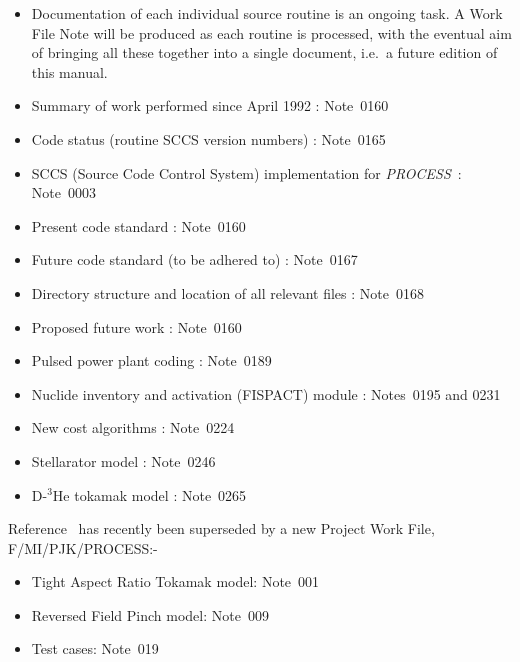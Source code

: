 \documentclass[11pt,a4paper]{report}
\newcommand{\PS}{\mbox{\it PROCESS\/ }}
\begin{document}
\begin{itemize}
\item
Documentation of each individual source routine is an ongoing task. A
Work File Note will be produced as each routine is processed, with the
eventual aim of bringing all these together into a single document,
i.e.\ a future edition of this manual.
\item
Summary of work performed since April 1992 : Note~0160
\item
Code status (routine SCCS version numbers) : Note~0165
\item
SCCS (Source Code Control System) implementation for \PS : Note~0003
\item
Present code standard : Note~0160
\item
Future code standard (to be adhered to) : Note~0167
\item
Directory structure and location of all relevant files : Note~0168
\item
Proposed future work : Note~0160
\item
Pulsed power plant coding : Note~0189
\item
Nuclide inventory and activation (FISPACT) module : Notes~0195 and 0231
\item
New cost algorithms : Note~0224
\item
Stellarator model : Note~0246
\item
D-$^3$He tokamak model : Note~0265
\end{itemize}

Reference~\cite{PWF} has recently been superseded by a new Project Work File,
F/MI/PJK/PROCESS:-

\begin{itemize}
\item
Tight Aspect Ratio Tokamak model: Note~001

\item
Reversed Field Pinch model: Note~009

\item
Test cases: Note~019

\end{itemize}
\end{document}
